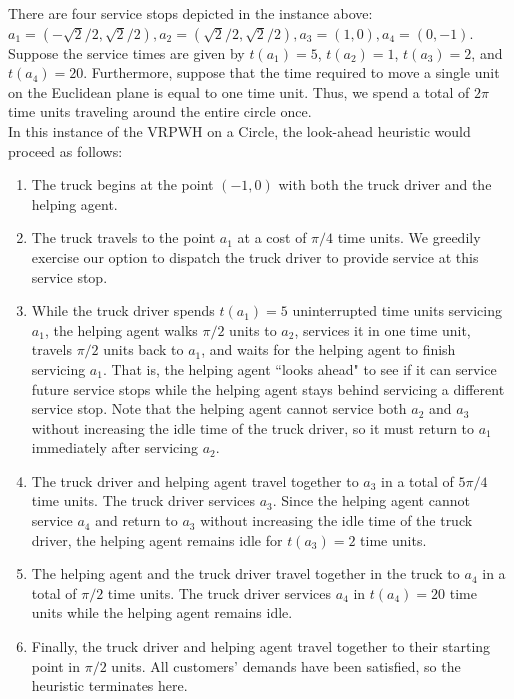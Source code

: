 \documentclass[12pt]{scrartcl}
\begin{document}
There are four service stops depicted in the instance above: $a_1 = (-\sqrt{2}/2, \sqrt{2}/2), a_2 = (\sqrt{2}/2, \sqrt{2}/2), a_3 = (1, 0), a_4 = (0, -1)$. Suppose the service times are given by $t(a_1) = 5$, $t(a_2) = 1$,  $t(a_3) = 2$, and $t(a_4) = 20$. Furthermore, suppose that the time required to move a single unit on the Euclidean plane is equal to one time unit. Thus, we spend a total of $2\pi$ time units traveling around the entire circle once. \\

In this instance of the VRPWH on a Circle, the look-ahead heuristic would proceed as follows:

\begin{enumerate}
    \item The truck begins at the point $(-1, 0)$ with both the truck driver and the helping agent. 
    \item The truck travels to the point $a_1$ at a cost of $\pi/4$ time units. We greedily exercise our option to dispatch the truck driver to provide service at this service stop. 
		\item While the truck driver spends $t(a_1) = 5$ uninterrupted time units servicing $a_1$, the helping agent walks $\pi/2$ units to $a_2$, services it in one time unit, travels $\pi/2$ units back to $a_1$, and waits for the helping agent to finish servicing $a_1$. That is, the helping agent ``looks ahead" to see if it can service future service stops while the helping agent stays behind servicing a different service stop. Note that the helping agent cannot service both $a_2$ and $a_3$ without increasing the idle time of the truck driver, so it must return to $a_1$ immediately after servicing $a_2$.  
    \item The truck driver and helping agent travel together to $a_3$ in a total of $5\pi/4$ time units. The truck driver services $a_3$. Since the helping agent cannot service $a_4$ and return to $a_3$ without increasing the idle time of the truck driver, the helping agent remains idle for $t(a_3) = 2$ time units. 
    \item The helping agent and the truck driver travel together in the truck to $a_4$ in a total of $\pi/2$ time units. The truck driver services $a_4$ in $t(a_4) = 20$ time units while the helping agent remains idle. 
    \item Finally, the truck driver and helping agent travel together to their starting point in $\pi/2$ units. All customers' demands have been satisfied, so the heuristic terminates here.
\end{enumerate}
\end{document}
